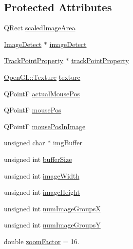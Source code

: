 \subsection*{Protected Attributes}
\begin{DoxyCompactItemize}
\item 
Q\+Rect \mbox{\hyperlink{class_image_open_g_l_widget_a3d9bf777ce1e2421b2160bd1924ddbea}{scaled\+Image\+Area}}
\item 
\mbox{\hyperlink{class_image_detect}{Image\+Detect}} $\ast$ \mbox{\hyperlink{class_image_open_g_l_widget_a33de4fe0a57b24dd5e0f0ea9b9c8a524}{image\+Detect}}
\item 
\mbox{\hyperlink{struct_track_point_property}{Track\+Point\+Property}} $\ast$ \mbox{\hyperlink{class_image_open_g_l_widget_aa525150cbd7dd57063306107da79aaf5}{track\+Point\+Property}}
\item 
\mbox{\hyperlink{class_open_g_l_1_1_texture}{Open\+G\+L\+::\+Texture}} \mbox{\hyperlink{class_image_open_g_l_widget_a70afc17e43c0925734da723ef409f3a5}{texture}}
\item 
Q\+PointF \mbox{\hyperlink{class_image_open_g_l_widget_a504949f3bdbae83e84c335fe3444b4d5}{actual\+Mouse\+Pos}}
\item 
Q\+PointF \mbox{\hyperlink{class_image_open_g_l_widget_a43adc2e21552e46e661998bf1af738f2}{mouse\+Pos}}
\item 
Q\+PointF \mbox{\hyperlink{class_image_open_g_l_widget_a1912119a80016ed9239166071d24962d}{mouse\+Pos\+In\+Image}}
\item 
unsigned char $\ast$ \mbox{\hyperlink{class_image_open_g_l_widget_a52ca337428d317ca2765cdf4d95e1b43}{img\+Buffer}}
\item 
unsigned int \mbox{\hyperlink{class_image_open_g_l_widget_a2c22ecc7b2355c66ed8d7ca6d824404e}{buffer\+Size}}
\item 
unsigned int \mbox{\hyperlink{class_image_open_g_l_widget_a8c3fbf15ba41c21741f8916079f5b6c3}{image\+Width}}
\item 
unsigned int \mbox{\hyperlink{class_image_open_g_l_widget_a30f0fce34d5d14972dce2c2d534aa692}{image\+Height}}
\item 
unsigned int \mbox{\hyperlink{class_image_open_g_l_widget_a2c07dae50d938be8bbe60d253ee2d93b}{num\+Image\+GroupsX}}
\item 
unsigned int \mbox{\hyperlink{class_image_open_g_l_widget_a408eb368d49090f7ee75fb1cd3a470da}{num\+Image\+GroupsY}}
\item 
double \mbox{\hyperlink{class_image_open_g_l_widget_acbc58856739558290b873f3266ae2939}{zoom\+Factor}} = 16.

\end{DoxyCompactItemize}
